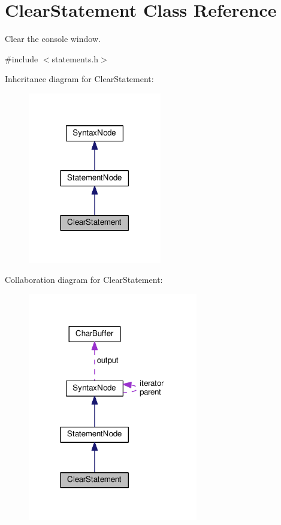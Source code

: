 \hypertarget{classClearStatement}{}\section{Clear\+Statement Class Reference}
\label{classClearStatement}


Clear the console window.  




{\ttfamily \#include $<$statements.\+h$>$}



Inheritance diagram for Clear\+Statement\+:
\nopagebreak
\begin{figure}[H]
\begin{center}
\leavevmode
\includegraphics[width=165pt]{d8/d79/classClearStatement__inherit__graph}
\end{center}
\end{figure}


Collaboration diagram for Clear\+Statement\+:
\nopagebreak
\begin{figure}[H]
\begin{center}
\leavevmode
\includegraphics[width=210pt]{d3/df2/classClearStatement__coll__graph}
\end{center}
\end{figure}
